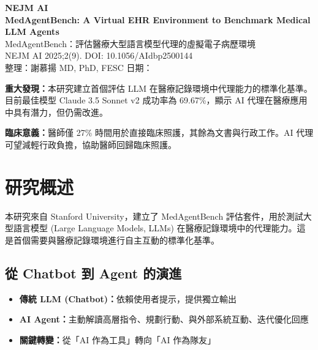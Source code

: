 \documentclass[12pt,a4paper]{article}
\newcommand{\mydate}{\DTMtoday}
\begin{document}

\begin{center}
{\LARGE\bfseries\textcolor{emergency_red}{NEJM AI}}\\[0.5cm]
{\Large\textbf{MedAgentBench: A Virtual EHR Environment to Benchmark Medical LLM Agents}}\\[0.3cm]
{\large MedAgentBench：評估醫療大型語言模型代理的虛擬電子病歷環境}\\[0.5cm]
{\normalsize NEJM AI 2025;2(9). DOI: 10.1056/AIdbp2500144}\\[0.3cm]
{\normalsize 整理：謝慕揚 MD, PhD, FESC \quad 日期：\mydate}
\end{center}

\vspace{0.5cm}

\begin{tcolorbox}[colback=yellow!10!white,colframe=orange!75!black,title=\textbf{核心發現摘要}]
\textbf{重大發現：}本研究建立首個評估 LLM 在醫療記錄環境中代理能力的標準化基準。目前最佳模型 Claude 3.5 Sonnet v2 成功率為 69.67\%，顯示 AI 代理在醫療應用中具有潛力，但仍需改進。

\textbf{臨床意義：}醫師僅 27\% 時間用於直接臨床照護，其餘為文書與行政工作。AI 代理可望減輕行政負擔，協助醫師回歸臨床照護。
\end{tcolorbox}

\tableofcontents
\newpage

\section{研究概述}

本研究來自 Stanford University，建立了 MedAgentBench 評估套件，用於測試大型語言模型 (Large Language Models, LLMs) 在醫療記錄環境中的代理能力。這是首個需要與醫療記錄環境進行自主互動的標準化基準。

\subsection{從 Chatbot 到 Agent 的演進}

\begin{itemize}
    \item \textbf{傳統 LLM (Chatbot)：}依賴使用者提示，提供獨立輸出
    \item \textbf{AI Agent：}主動解讀高層指令、規劃行動、與外部系統互動、迭代優化回應
    \item \textbf{關鍵轉變：}從「AI 作為工具」轉向「AI 作為隊友」
\end{itemize}
\end{document}
